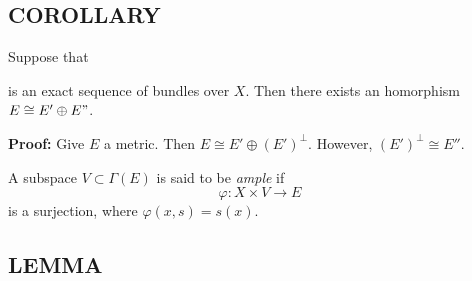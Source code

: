 \subsection{COROLLARY} Suppose that  is an exact sequence of bundles over $X$. Then there exists an homorphism $E \cong E' \oplus E"$. \par 

\textbf{Proof:} Give $E$ a metric. Then $E \cong E' \oplus (E')^\bot$. However, $(E')^\bot \cong E''$. \par \hfill

A subspace $V \subset \Gamma(E)$ is said to be \textit{ample} if
\begin{equation*}
    \varphi: X \times V \to E
\end{equation*}
is a surjection, where $\varphi(x, s) = s(x)$.

\subsection{LEMMA}\label{1.4.12}
